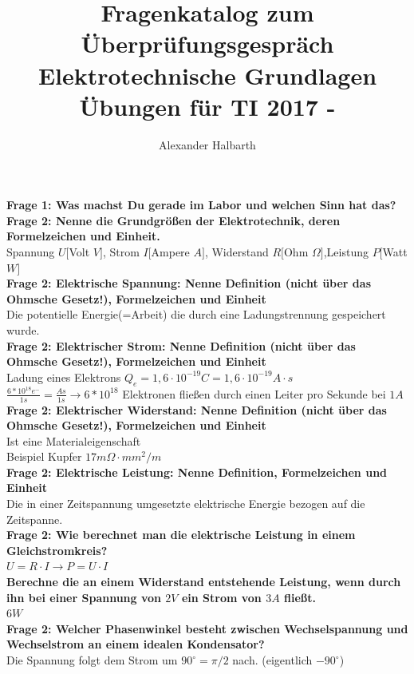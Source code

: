 \documentclass[11pt,a4paper]{scrartcl}
\author{Alexander Halbarth}
\title{\textbf{Fragenkatalog zum Überprüfungsgespräch Elektrotechnische Grundlagen Übungen für TI 2017 - \UE}}
\begin{document}
\maketitle

\textbf{Frage 1: Was machst Du gerade im Labor und welchen Sinn hat das?}\\
\textbf{Frage 2: Nenne die Grundgrößen der Elektrotechnik, deren Formelzeichen und Einheit.}\\
Spannung $U[$Volt $V]$, Strom $I[$Ampere $A]$, Widerstand $R[$Ohm $\Omega]$,Leistung $P[$Watt $W]$\\
\textbf{Frage 2: Elektrische Spannung: Nenne Definition (nicht über das Ohmsche Gesetz!), Formelzeichen und Einheit}\\
Die potentielle Energie(=Arbeit) die durch eine Ladungstrennung gespeichert wurde.\\
\textbf{Frage 2: Elektrischer Strom: Nenne Definition (nicht über das Ohmsche Gesetz!), Formelzeichen und Einheit}\\
Ladung eines Elektrons $Q_e=1,6 \cdot 10^{-19}C=1,6 \cdot 10^{-19}A\cdot s$\\
$\frac{6*10^{18}e^-}{1s}=\frac{As}{1s} \rightarrow 6*10^{18}$ Elektronen fließen durch einen Leiter pro Sekunde bei $1A$\\
\textbf{Frage 2: Elektrischer Widerstand: Nenne Definition (nicht über das Ohmsche Gesetz!), Formelzeichen und Einheit}\\
Ist eine Materialeigenschaft\\
Beispiel Kupfer $17m\Omega \cdot mm^2/m$\\
\textbf{Frage 2: Elektrische Leistung: Nenne Definition, Formelzeichen und Einheit}\\
Die in einer Zeitspannung umgesetzte elektrische Energie bezogen auf die Zeitspanne.\\
\textbf{Frage 2: Wie berechnet man die elektrische Leistung in einem Gleichstromkreis?}\\
$U=R \cdot I \rightarrow P=U \cdot I$\\
\textbf{Berechne die an einem Widerstand entstehende Leistung, wenn durch ihn bei einer Spannung von $2V$ ein Strom von $3A$ fließt.}\\
$6W$\\
\textbf{Frage 2: Welcher Phasenwinkel besteht zwischen Wechselspannung und Wechselstrom an einem idealen Kondensator?}\\
Die Spannung folgt dem Strom um $90^\circ=\pi/2$ nach. (eigentlich $-90^\circ$)\\
\end{document}
